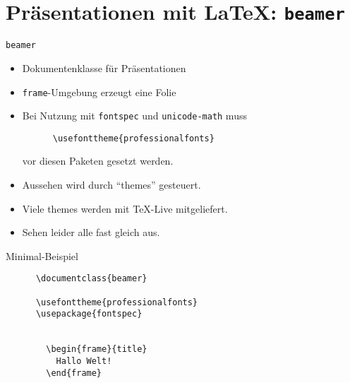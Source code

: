 \section{Präsentationen mit \LaTeX: \lstinline+beamer+}

\begin{frame}[fragile]{\lstinline+beamer+}
  \begin{itemize}
    \item Dokumentenklasse für Präsentationen
    \item \lstinline+frame+-Umgebung erzeugt eine Folie
    \item Bei Nutzung mit \lstinline+fontspec+ und \lstinline+unicode-math+ muss
      \begin{lstlisting}
      \usefonttheme{professionalfonts}
      \end{lstlisting}
      vor diesen Paketen gesetzt werden.
    \item Aussehen wird durch \enquote{themes} gesteuert.
    \item Viele themes werden mit \TeX-Live mitgeliefert.
    \item Sehen leider alle fast gleich aus.
  \end{itemize}
\end{frame}
\begin{frame}[fragile]{Minimal-Beispiel}
  \begin{center}
    \begin{lstlisting}
      \documentclass{beamer}

      \usefonttheme{professionalfonts}
      \usepackage{fontspec}

      
        \begin{frame}{title}
          Hallo Welt!
        \end{frame}
      
    \end{lstlisting}
  \end{center}
\end{frame}
